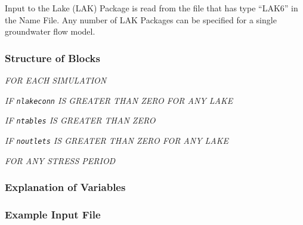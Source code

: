 Input to the Lake (LAK) Package is read from the file that has type ``LAK6'' in the Name File.  Any number of LAK Packages can be specified for a single groundwater flow model.

\vspace{5mm}
\subsubsection{Structure of Blocks}
\vspace{5mm}

\noindent \textit{FOR EACH SIMULATION}



\noindent \textit{IF \texttt{nlakeconn} IS GREATER THAN ZERO FOR ANY LAKE}

\noindent \textit{IF \texttt{ntables} IS GREATER THAN ZERO}

\noindent \textit{IF \texttt{noutlets} IS GREATER THAN ZERO FOR ANY LAKE}


\vspace{5mm}
\noindent \textit{FOR ANY STRESS PERIOD}


\vspace{5mm}
\subsubsection{Explanation of Variables}
\begin{description}

\end{description}

\vspace{5mm}
\subsubsection{Example Input File}


\vspace{5mm}
